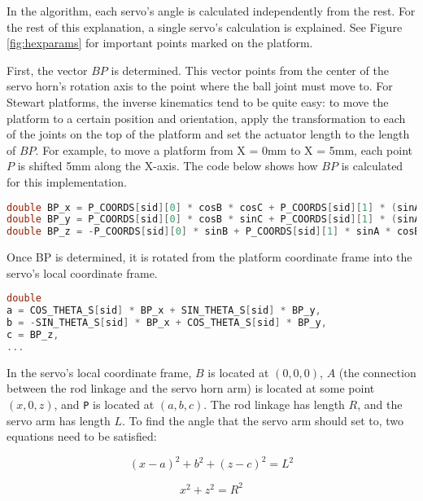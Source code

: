 \documentclass[11pt]{ucthesisCP}
\begin{document}
In the algorithm, each servo’s angle is calculated independently from the rest. For the rest of this explanation, a single servo’s calculation is explained. See Figure \ref{fig:hexparams} for important points marked on the platform.

First, the vector \(BP\) is determined. This vector points from the center of the servo horn’s rotation axis to the point where the ball joint must move to. For Stewart platforms, the inverse kinematics tend to be quite easy: to move the platform to a certain position and orientation, apply the transformation to each of the joints on the top of the platform and set the actuator length to the length of \(BP\). For example, to move a platform from X = 0mm to X = 5mm, each point \(P\) is shifted 5mm along the X-axis. The code below shows how \(BP\) is calculated for this implementation.

\begin{lstlisting}[language=C++]
double BP_x = P_COORDS[sid][0] * cosB * cosC + P_COORDS[sid][1] * (sinA * sinB * cosC - cosA * sinC) + coord.hx_x - B_COORDS[sid][0];
double BP_y = P_COORDS[sid][0] * cosB * sinC + P_COORDS[sid][1] * (sinA * sinB * sinC + cosA * cosC) + coord.hx_y - B_COORDS[sid][1];
double BP_z = -P_COORDS[sid][0] * sinB + P_COORDS[sid][1] * sinA * cosB + coord.hx_z - Z_HOME;
\end{lstlisting}

Once BP is determined, it is rotated from the platform coordinate frame into the servo’s local coordinate frame.

\begin{lstlisting}[language=C++]
double
a = COS_THETA_S[sid] * BP_x + SIN_THETA_S[sid] * BP_y,
b = -SIN_THETA_S[sid] * BP_x + COS_THETA_S[sid] * BP_y,
c = BP_z,
...
\end{lstlisting}

In the servo’s local coordinate frame, \(B\) is located at \((0, 0, 0)\), \(A\) (the connection between the rod linkage and the servo horn arm) is located at some point \((x, 0, z)\), and \verb|P| is located at \((a, b, c)\). The rod linkage has length \(R\), and the servo arm has length \(L\). To find the angle that the servo arm should set to, two equations need to be satisfied:

\begin{equation}\label{eq:2eq1}
	(x-a)^2 + b^2 + (z-c)^2 = L^2
\end{equation}

\begin{equation}\label{2eq2}
	x^2 + z^2 = R^2
\end{equation}
\end{document}
